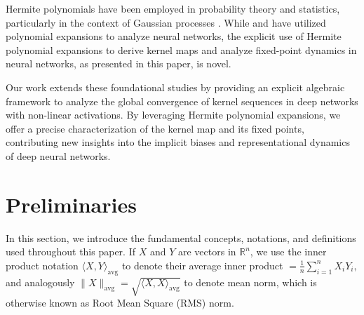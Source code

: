 \documentclass[twoside]{article}
\newcommand{\avg}{\mathrm{avg}}
\newcommand{\E}{\mathbb{E}}
\theoremstyle{definition}
\begin{document}
Hermite polynomials have been employed in probability theory and statistics, particularly in the context of Gaussian processes \citep{williams2006gaussian}. While \citet{poole2016exponential} and \citet{daniely2016toward} have utilized polynomial expansions to analyze neural networks, the explicit use of Hermite polynomial expansions to derive kernel maps and analyze fixed-point dynamics in neural networks, as presented in this paper, is novel.

Our work extends these foundational studies by providing an explicit algebraic framework to analyze the global convergence of kernel sequences in deep networks with non-linear activations. By leveraging Hermite polynomial expansions, we offer a precise characterization of the kernel map and its fixed points, contributing new insights into the implicit biases and representational dynamics of deep neural networks.

\section{Preliminaries}
In this section, we introduce the fundamental concepts, notations, and definitions used throughout this paper. 
If $X$ and $Y$ are vectors in $\mathbb{R}^n$, we use the inner product notation $\langle X, Y \rangle_\avg$ to denote their average inner product $ = \frac{1}{n} \sum_{i=1}^n X_i Y_i,$ and analogously $\|X\|_\avg = \sqrt{\langle X, X \rangle_\avg}$ to denote mean norm, which is otherwise known as Root Mean Square (RMS) norm. 

\end{document}
